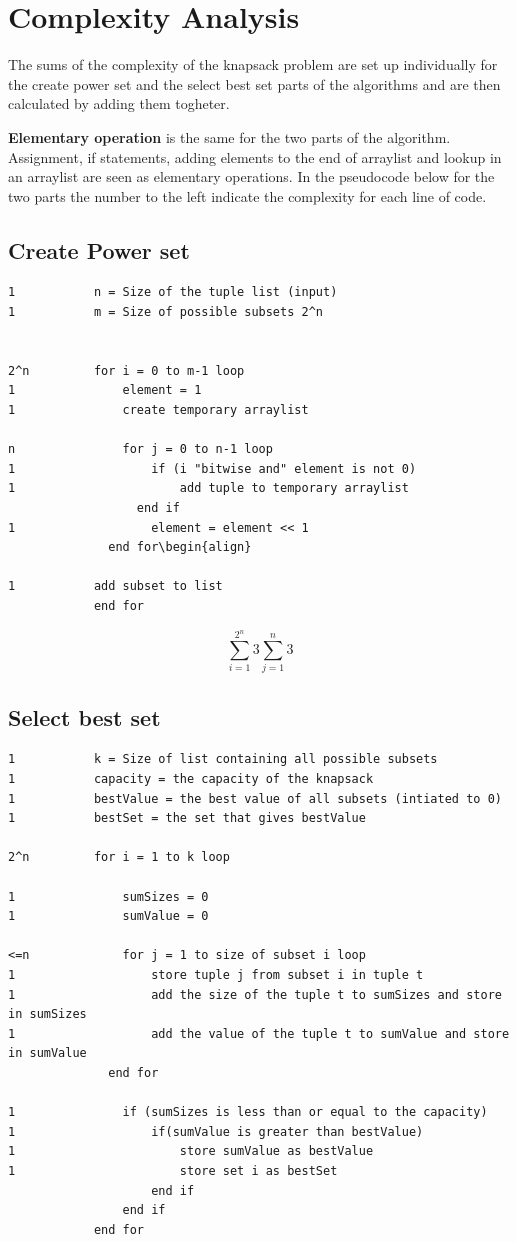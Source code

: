 \documentclass{inc/mas}
\begin{document}
\section{Complexity Analysis}

The sums of the complexity of the knapsack problem are set up individually for the create power set and the select best set parts of the algorithms and are then calculated by adding them togheter.

\textbf{Elementary operation} is the same for the two parts of the algorithm. Assignment, if statements, adding elements to the end of arraylist and lookup in an arraylist are seen as elementary operations. In the pseudocode below for the two parts the number to the left indicate the complexity for each line of code.

\subsection{Create Power set}

\begin{lstlisting}
1			n = Size of the tuple list (input)
1			m = Size of possible subsets 2^n


2^n			for i = 0 to m-1 loop	
1				element = 1	
1				create temporary arraylist
	  
n				for j = 0 to n-1 loop	
1					if (i "bitwise and" element is not 0)
1						add tuple to temporary arraylist
				  end if
1					element = element << 1
			  end for\begin{align}
	
1			add subset to list
			end for
\end{lstlisting}

\begin{equation}
\sum^{2^n}_{i =1}3\sum^n_{j=1}3%
\end{equation}


\subsection{Select best set}

\begin{lstlisting}
1			k = Size of list containing all possible subsets
1			capacity = the capacity of the knapsack
1			bestValue = the best value of all subsets (intiated to 0)
1			bestSet = the set that gives bestValue

2^n			for i = 1 to k loop

1				sumSizes = 0
1				sumValue = 0

<=n				for j = 1 to size of subset i loop
1					store tuple j from subset i in tuple t
1					add the size of the tuple t to sumSizes and store in sumSizes
1					add the value of the tuple t to sumValue and store in sumValue
			  end for

1				if (sumSizes is less than or equal to the capacity)
1					if(sumValue is greater than bestValue)
1						store sumValue as bestValue
1						store set i as bestSet
					end if
				end if
			end for
\end{lstlisting}
\end{document}
